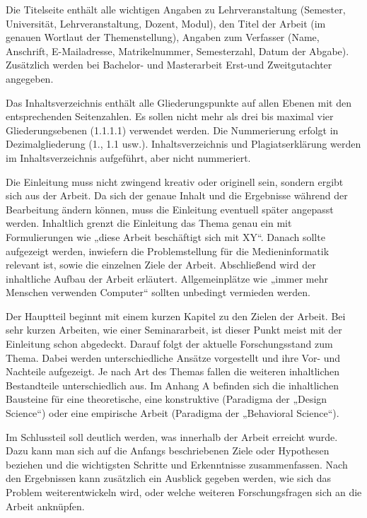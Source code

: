 
Die Titelseite enthält alle wichtigen Angaben zu Lehrveranstaltung (Semester, Universität, Lehrveranstaltung, Dozent, Modul), den Titel der Arbeit (im genauen Wortlaut der Themenstellung), Angaben zum Verfasser (Name, Anschrift, E-Mailadresse, Matrikelnummer, Semesterzahl, Datum der Abgabe). Zusätzlich werden bei Bachelor- und Masterarbeit Erst-und Zweitgutachter angegeben.


Das Inhaltsverzeichnis enthält alle Gliederungspunkte auf allen Ebenen mit den entsprechenden Seitenzahlen. Es sollen nicht mehr als drei bis maximal vier Gliederungsebenen (1.1.1.1) verwendet werden. Die Nummerierung erfolgt in Dezimalgliederung (1., 1.1 usw.). Inhaltsverzeichnis und Plagiatserklärung werden im Inhaltsverzeichnis aufgeführt, aber nicht nummeriert.


Die Einleitung muss nicht zwingend kreativ oder originell sein, sondern ergibt sich aus der Arbeit. Da sich der genaue Inhalt und die Ergebnisse während der Bearbeitung ändern können, muss die Einleitung eventuell später angepasst werden. Inhaltlich grenzt die Einleitung das Thema genau ein mit Formulierungen wie „diese Arbeit beschäftigt sich mit XY“. Danach sollte aufgezeigt werden, inwiefern die Problemstellung für die Medieninformatik relevant ist, sowie die einzelnen Ziele der Arbeit. Abschließend wird der inhaltliche Aufbau der Arbeit erläutert. Allgemeinplätze wie „immer mehr Menschen verwenden Computer“ sollten unbedingt vermieden werden.


Der Hauptteil beginnt mit einem kurzen Kapitel zu den Zielen der Arbeit. Bei sehr kurzen Arbeiten, wie einer Seminararbeit, ist dieser Punkt meist mit der Einleitung schon abgedeckt. Darauf folgt der aktuelle Forschungsstand zum Thema. Dabei werden unterschiedliche Ansätze vorgestellt und ihre Vor- und Nachteile aufgezeigt. Je nach Art des Themas fallen die weiteren inhaltlichen Bestandteile unterschiedlich aus. Im Anhang A befinden sich die inhaltlichen Bausteine für eine theoretische, eine konstruktive (Paradigma der „Design Science“) oder eine empirische Arbeit (Paradigma der „Behavioral Science“).


Im Schlussteil soll deutlich werden, was innerhalb der Arbeit erreicht wurde. Dazu kann man sich auf die Anfangs beschriebenen Ziele oder Hypothesen beziehen und die wichtigsten Schritte und Erkenntnisse zusammenfassen. Nach den Ergebnissen kann zusätzlich ein Ausblick gegeben werden, wie sich das Problem weiterentwickeln wird, oder welche weiteren Forschungsfragen sich an die Arbeit anknüpfen.


